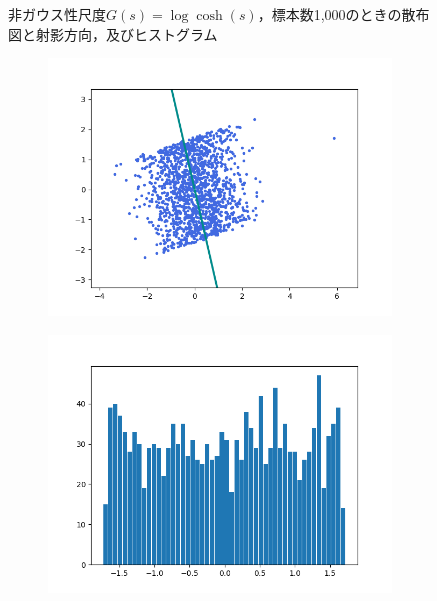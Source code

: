 \documentclass[class=jsarticle, crop=false, dvipdfmx, fleqn]{standalone}
\begin{document}
\begin{figure}
\begin{minipage}{0.45\linewidth}
\begin{figure}[H]
            \label{fig:logcosh_n1000_hist}
        \end{figure}
    \end{minipage}
    \caption{非ガウス性尺度\(G(s) = \log\cosh(s)\)，標本数1,000のときの散布図と射影方向，及びヒストグラム}
    \label{fig:logcosh_n1000}
\end{figure}

\begin{figure}
	\centering
    \begin{minipage}{0.45\linewidth}
        \begin{figure}[H]
        	   \centering
            \includegraphics[clip, width=\linewidth]{../figures/assignment2_result_logcosh_n1500_scatter.png}
            \label{fig:logcosh_n1500_scatter}
        \end{figure}
    \end{minipage}
    \begin{minipage}{0.45\linewidth}
        \begin{figure}[H]
            \centering
            \includegraphics[clip, width=\linewidth]{../figures/assignment2_result_logcosh_n1500_hist.png}

\end{figure}
\end{minipage}
\end{figure}
\end{document}
